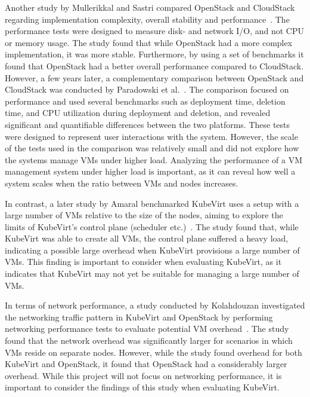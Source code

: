 \documentclass{article}
\begin{document}
Another study by Mullerikkal and Sastri compared OpenStack and CloudStack regarding implementation complexity, overall stability and performance\ \cite{cs-os-comparison-2009}. The performance tests were designed to measure disk- and network I/O, and not CPU or memory usage. The study found that while OpenStack had a more complex implementation, it was more stable. Furthermore, by using a set of benchmarks it found that OpenStack had a better overall performance compared to CloudStack. However, a few years later, a complementary comparison between OpenStack and CloudStack was conducted by Paradowski et al.\ \cite{cs-os-comparison-2013}. The comparison focused on performance and used several benchmarks such as deployment time, deletion time, and CPU utilization during deployment and deletion, and revealed significant and quantifiable differences between the two platforms. These tests were designed to represent user interactions with the system. However, the scale of the tests used in the comparison was relatively small and did not explore how the systems manage VMs under higher load. Analyzing the performance of a VM management system under higher load is important, as it can reveal how well a system scales when the ratio between VMs and nodes increases. 

In contrast, a later study by Amaral benchmarked KubeVirt uses a setup with a large number of VMs relative to the size of the nodes, aiming to explore the limits of KubeVirt's control plane (scheduler etc.)\ \cite{ibm-kubevirt-scale}. The study found that, while KubeVirt was able to create all VMs, the control plane suffered a heavy load, indicating a possible large overhead when KubeVirt provisions a large number of VMs. This finding is important to consider when evaluating KubeVirt, as it indicates that KubeVirt may not yet be suitable for managing a large number of VMs.

In terms of network performance, a study conducted by Kolahdouzan investigated the networking traffic pattern in KubeVirt and OpenStack by performing networking performance tests to evaluate potential VM overhead\ \cite{kubevirt-openstack-network}. The study found that the network overhead was significantly larger for scenarios in which VMs reside on separate nodes. However, while the study found overhead for both KubeVirt and OpenStack, it found that OpenStack had a considerably larger overhead. While this project will not focus on networking performance, it is important to consider the findings of this study when evaluating KubeVirt.
\end{document}
